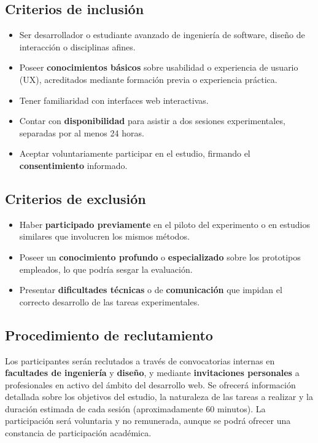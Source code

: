 \documentclass[a4paper,12pt]{report}
\begin{document}
\subsection*{Criterios de inclusión}
\begin{itemize}
    \item Ser desarrollador o estudiante avanzado de ingeniería de software, diseño de interacción o disciplinas afines.
    \item Poseer \textbf{conocimientos básicos} sobre usabilidad o experiencia de usuario (UX), acreditados mediante formación previa o experiencia práctica.
    \item Tener familiaridad con interfaces web interactivas.
    \item Contar con \textbf{disponibilidad} para asistir a dos sesiones experimentales, separadas por al menos 24 horas.
    \item Aceptar voluntariamente participar en el estudio, firmando el \textbf{consentimiento} informado.
\end{itemize}

\subsection*{Criterios de exclusión}
\begin{itemize}
    \item Haber \textbf{participado previamente} en el piloto del experimento o en estudios similares que involucren los mismos métodos.
    \item Poseer un \textbf{conocimiento profundo} o \textbf{especializado} sobre los prototipos empleados, lo que podría sesgar la evaluación.
    \item Presentar \textbf{dificultades técnicas} o de \textbf{comunicación} que impidan el correcto desarrollo de las tareas experimentales.
\end{itemize}

\subsection*{Procedimiento de reclutamiento}
Los participantes serán reclutados a través de convocatorias internas en \textbf{facultades de ingeniería} y \textbf{diseño}, y mediante \textbf{invitaciones personales} a profesionales en activo del ámbito del desarrollo web. Se ofrecerá información detallada sobre los objetivos del estudio, la naturaleza de las tareas a realizar y la duración estimada de cada sesión (aproximadamente 60 minutos). La participación será voluntaria y no remunerada, aunque se podrá ofrecer una constancia de participación académica.
\end{document}
